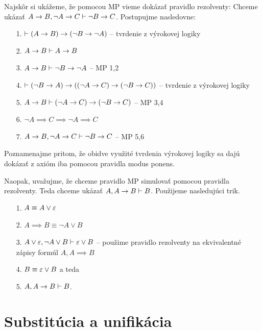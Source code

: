 \begin{dokaz}
    Najskôr si ukážeme, že pomocou MP vieme dokázať pravidlo rezolventy:
    Chceme ukázať $A \rightarrow B, \neg A \rightarrow C \vdash \neg B
    \rightarrow C$.
    Postupujme nasledovne:
    \begin{itemize}
        \item[1.] $\vdash (A \rightarrow B) \rightarrow (\neg B \rightarrow
                \neg A)$ -- tvrdenie z výrokovej logiky
        \item[2.] $A \rightarrow B \vdash A \rightarrow B$
        \item[3.] $A \rightarrow B \vdash \neg B \rightarrow \neg A$ --
                MP 1,2
        \item[4.] $\vdash (\neg B \rightarrow A) \rightarrow
            ((\neg A \rightarrow C) \rightarrow (\neg B \rightarrow C))$ --
                tvrdenie z výrokovej logiky
        \item[5.] $A \rightarrow B \vdash
            (\neg A \rightarrow C) \rightarrow (\neg B \rightarrow C)$ -- MP
            3,4
        \item[6.] $\neg A \implies C \implies \neg A \implies C$
        \item[7.] $A \rightarrow B, \neg A \rightarrow C \vdash
            \neg B \rightarrow C$ -- MP 5,6
    \end{itemize}
    Poznamenajme pritom, že obidve využité tvrdenia výrokovej logiky
    sa dajú dokázať z axióm iba pomocou pravidla modus ponens.

    Naopak, uvažujme, že chceme pravidlo MP simulovať pomocou pravidla
    rezolventy. Teda chceme ukázať $A, A\rightarrow B \vdash B$.
    Použijeme nasledujúci trik.
    \begin{itemize}
        \item[1.] $A \equiv A \lor \varepsilon$
        \item[2.] $A \implies B \equiv \neg A \lor B$
        \item[3.] $A \lor \varepsilon, \neg A \lor B \vdash \varepsilon \lor B$
            -- použime pravidlo rezolventy na ekvivalentné zápisy
            formúl $A, A\implies B$
        \item[4.] $B \equiv \varepsilon \lor B$ a teda
        \item[5.] $A,A\rightarrow B \vdash B$.
    \end{itemize}
\end{dokaz}

\section{Substitúcia a unifikácia}
\startFIXME

